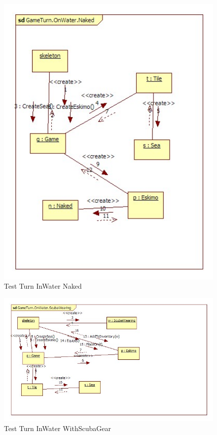 \begin{figure}[H]
	\begin{center}
		\includegraphics[width=12cm]{chapters/chapter05/diagrams/Test_Turn_InWater_Naked_init.jpg}
		\caption{Test Turn InWater Naked}
		\label{fig:Test Turn InWater Naked}
	\end{center}
\end{figure}

\begin{figure}[H]
	\begin{center}
		\includegraphics[width=17cm]{chapters/chapter05/diagrams/Test_Turn_InWater_WithScubaGear_init.jpg}
		\caption{Test Turn InWater WithScubaGear}
		\label{fig:Test Turn InWater WithScubaGear}
	\end{center}
\end{figure}

